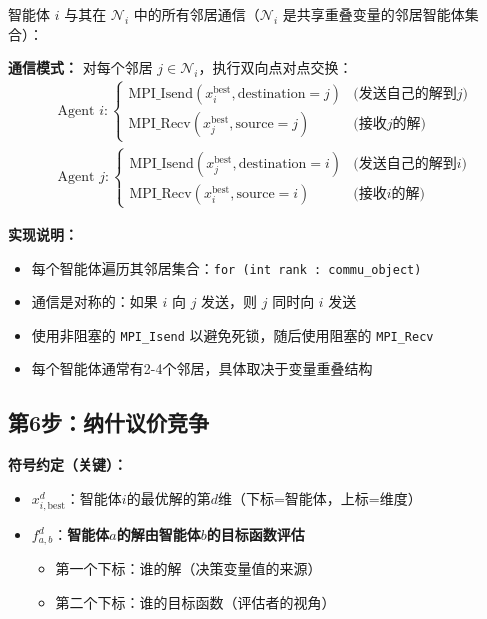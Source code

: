 \documentclass[11pt,a3paper]{ctexart}
\begin{document}
智能体 $i$ 与其在 $\mathcal{N}_i$ 中的所有邻居通信（$\mathcal{N}_i$ 是共享重叠变量的邻居智能体集合）：

\textbf{通信模式：} 对每个邻居 $j \in \mathcal{N}_i$，执行双向点对点交换：
\begin{equation}
\begin{aligned}
&\text{Agent } i: \begin{cases}
\text{MPI\_Isend}(x_i^{\text{best}}, \text{destination}=j) & \text{(发送自己的解到} j\text{)} \\
\text{MPI\_Recv}(x_j^{\text{best}}, \text{source}=j) & \text{(接收} j\text{的解)}
\end{cases} \\
&\text{Agent } j: \begin{cases}
\text{MPI\_Isend}(x_j^{\text{best}}, \text{destination}=i) & \text{(发送自己的解到} i\text{)} \\
\text{MPI\_Recv}(x_i^{\text{best}}, \text{source}=i) & \text{(接收} i\text{的解)}
\end{cases}
\end{aligned}
\end{equation}

\textbf{实现说明：}
\begin{itemize}
    \item 每个智能体遍历其邻居集合：\texttt{for (int rank : commu\_object)}
    \item 通信是对称的：如果 $i$ 向 $j$ 发送，则 $j$ 同时向 $i$ 发送
    \item 使用非阻塞的 \texttt{MPI\_Isend} 以避免死锁，随后使用阻塞的 \texttt{MPI\_Recv}
    \item 每个智能体通常有2-4个邻居，具体取决于变量重叠结构
\end{itemize}
\subsection{第6步：纳什议价竞争}

\textbf{符号约定（关键）：}
\begin{itemize}
    \item $x_{i,\text{best}}^d$：智能体$i$的最优解的第$d$维（下标=智能体，上标=维度）
    \item $f_{a,b}^d$：\textbf{智能体$a$的解由智能体$b$的目标函数评估}
    \begin{itemize}
        \item 第一个下标：谁的解（决策变量值的来源）
        \item 第二个下标：谁的目标函数（评估者的视角）
    \end{itemize}
\end{itemize}
\end{document}
